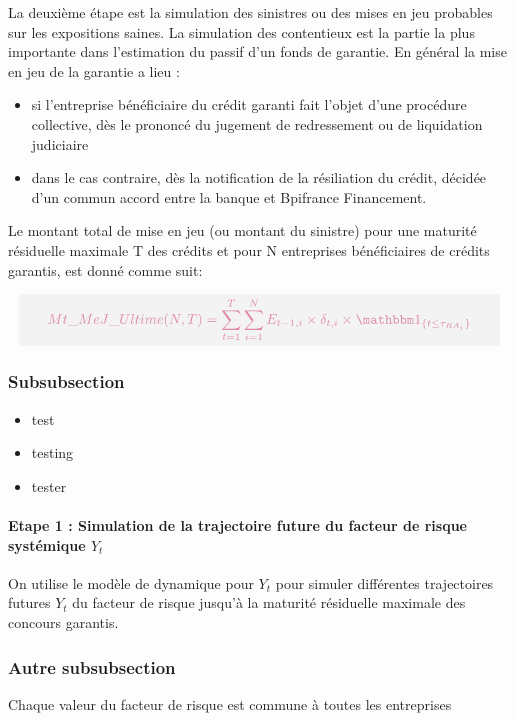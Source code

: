 \documentclass[12pt,a4paper]{report}
\begin{document}
La deuxième étape est la simulation des sinistres ou des mises en jeu probables sur les expositions saines. La simulation des contentieux est la partie la plus importante dans l’estimation du passif d’un fonds de garantie. 
En général la mise en jeu de la garantie  a lieu :
\begin{itemize}
	\item si l’entreprise bénéficiaire du crédit garanti fait l’objet d’une procédure collective, dès le prononcé du jugement de redressement ou de liquidation judiciaire
 	\item dans le cas contraire, dès la notification de la résiliation du crédit, décidée d’un commun accord entre la banque et Bpifrance Financement.
\end{itemize}
 
Le montant total de mise en jeu (ou montant du sinistre) pour une maturité résiduelle maximale T des crédits et pour N entreprises bénéficiaires de crédits garantis, est donné comme suit:

\[
\boxedb{
Mt\_MeJ\_Ultime(N,T) = \sum_{t=1}^T\sum_{i=1}^N E_{t-1,i}\times\delta_{t,i}\times\indic{t\leq \tau_{RA_i}}
}
\]



\subsubsection{Subsubsection}
\lipsum

\begin{itemize}
    \item test
    \item testing
\item tester
\end{itemize}

\paragraph{Etape 1 : Simulation de la trajectoire future du facteur de risque systémique $Y_t$}
On utilise le modèle de dynamique pour $Y_t$ pour simuler différentes trajectoires futures $Y_t$  du facteur de risque jusqu’à la maturité résiduelle maximale des concours garantis. 

\subsubsection{Autre subsubsection}
Chaque valeur du facteur de risque est commune à toutes les entreprises
\end{document}
